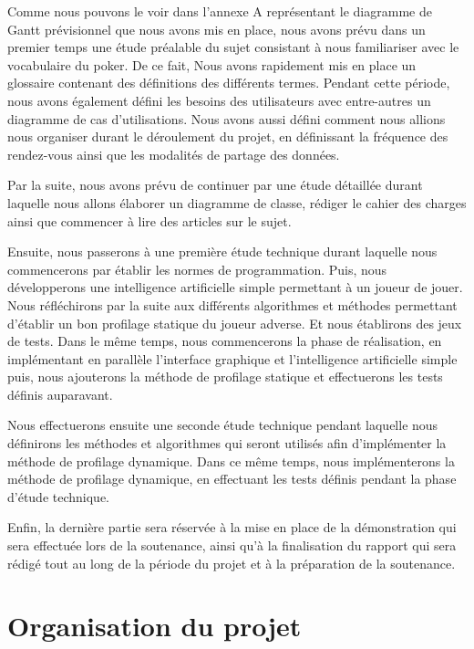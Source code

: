 \documentclass{report}
\begin{document}
\hspace{0.5cm}Comme nous pouvons le voir dans l'annexe A représentant le diagramme de Gantt prévisionnel que nous avons mis en place, nous avons prévu dans un premier temps une étude préalable du sujet consistant à nous familiariser avec le vocabulaire du poker. De ce fait, Nous avons rapidement mis en place un glossaire contenant des définitions des différents termes. Pendant cette période, nous avons également défini les besoins des utilisateurs avec entre-autres un diagramme de cas d'utilisations. Nous avons aussi défini comment nous allions nous organiser durant le déroulement du projet, en définissant la fréquence des rendez-vous ainsi que les modalités de partage des données.\par
Par la suite, nous avons prévu de continuer par une étude détaillée durant laquelle nous allons élaborer un diagramme de classe, rédiger le cahier des charges ainsi que commencer à lire des articles sur le sujet.\par
Ensuite, nous passerons à une première étude technique durant laquelle nous commencerons par établir les normes de programmation. Puis, nous développerons une intelligence artificielle simple permettant à un joueur de jouer. Nous réfléchirons par la suite aux différents algorithmes et méthodes permettant d'établir un bon profilage statique du joueur adverse. Et nous établirons des jeux de tests. Dans le même temps, nous commencerons la phase de réalisation, en implémentant en parallèle l'interface graphique et l'intelligence artificielle simple puis, nous ajouterons la méthode de profilage statique et effectuerons les tests définis auparavant.\par
Nous effectuerons ensuite une seconde étude technique pendant laquelle nous définirons les méthodes et algorithmes qui seront utilisés afin d'implémenter la méthode de profilage dynamique. Dans ce même temps, nous implémenterons la méthode de profilage dynamique, en effectuant les tests définis pendant la phase d'étude technique.\par
Enfin, la dernière partie sera réservée à la mise en place de la démonstration qui sera effectuée lors de la soutenance, ainsi qu'à la finalisation du rapport qui sera rédigé tout au long de la période du projet et à la préparation de la soutenance.\par

\chapter{Organisation du projet}
\end{document}
